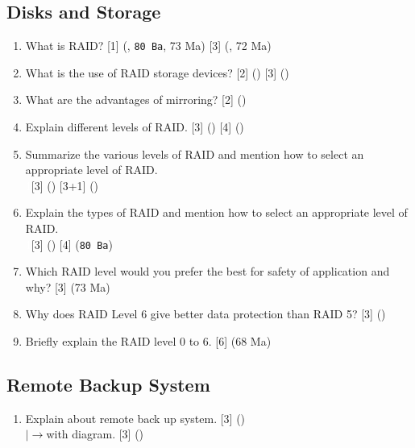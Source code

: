 \documentclass[12pt]{article}
\newcommand{\lb}{\\$\left|\rightarrow\right.$}
\newcommand{\enter}{\\\textcolor{white}{1}}
\begin{document}
    \subsection{Disks and Storage}
    		\begin{enumerate}[noitemsep, topsep=0pt]
    			\item What is RAID? \hfill [1] (, \texttt{80 Ba}, 73 Ma) [3] (, 72 Ma)
    			
			\item What is the use of RAID storage devices? \hfill [2] () [3] ()
			
			\item What are the advantages of mirroring? \hfill [2] ()
    			
    			\item Explain different levels of RAID. \hfill [3] () [4] ()
    			
			\item Summarize the various levels of RAID and mention how to select an appropriate level of RAID.
			\enter\hfill [3] () [3+1] ()
    			
    			\item Explain the types of RAID and mention how to select an appropriate level of RAID.
    			\enter\hfill [3] () [4] (\texttt{80 Ba})
    			
    			\item Which RAID level would you prefer the best for safety of application and why? \hfill [3] (73 Ma)
    			
    			\item Why does RAID Level 6 give better data protection than RAID 5?  \hfill [3] ()
    			
    			\item Briefly explain the RAID level 0 to 6. \hfill [6] (68 Ma)
    		\end{enumerate}
    		
    \subsection{Remote Backup System}
		\begin{enumerate}[noitemsep, topsep=0pt]
			\item Explain about remote back up system. \hfill [3] ()
			\lb with diagram. \hfill [3] ()
		\end{enumerate}		    
    
\end{document}
